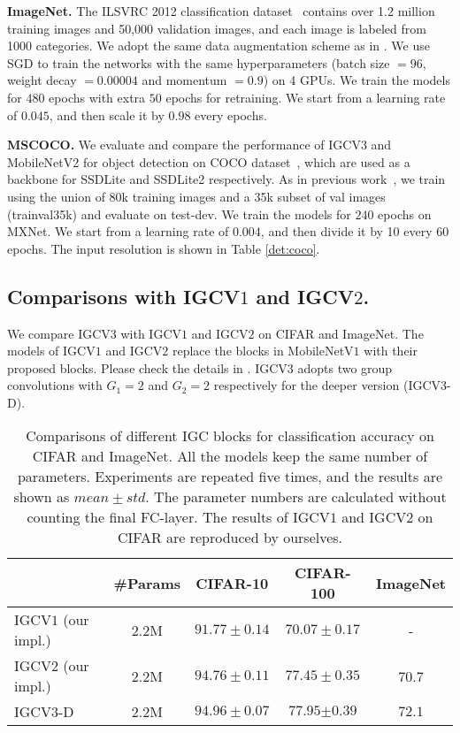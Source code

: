 \documentclass{bmvc2k}
\begin{document}
	\noindent\textbf{ImageNet.} The ILSVRC 2012 classification dataset~\cite{deng2009imagenet} contains over 1.2 million training images and 50,000 validation images, and each image is labeled from 1000 categories. We adopt the same data augmentation scheme as in \cite{HeZRS16,HeZRS16ECCV}. We use SGD to train the networks with the same hyperparameters (batch size $=96$, weight decay $=0.00004$ and momentum $=0.9$) on 4 GPUs. We train the models for $480$ epochs with extra $50$ epochs for retraining. We start from a learning rate of $0.045$, and then scale it by $0.98$ every epochs.

	\noindent\textbf{MSCOCO.} We evaluate and compare the performance of IGCV3 and MobileNetV2 for object detection on COCO dataset~\cite{lin2014microsoft}, which are used as a backbone for SSDLite and SSDLite2 respectively. As in previous work~\cite{sandler2018inverted}, we train using the union of 80k training images and a 35k subset of val images (trainval35k) and evaluate on test-dev.
	We train the models for $240$ epochs on MXNet. We start from a learning rate of $0.004$, and then divide it by 10 every 60 epochs. The input resolution is shown in Table \ref{det:coco}.
	\subsection{Comparisons with IGCV$1$ and IGCV$2$.}
	We compare IGCV$3$ with IGCV$1$ and IGCV$2$ on CIFAR and ImageNet. The models of IGCV$1$ and IGCV$2$ replace the blocks in MobileNetV$1$ with their proposed blocks. Please check the details in \cite{zhang2017interleaved,ISSC18}. IGCV$3$ adopts two group convolutions with $G_1=2$ and $G_2=2$ respectively for the deeper version (IGCV$3$-D).

	\begin{table}[htb!]
		\begin{center}
			\begin{tabular}{|l||c|c|c|c|}
				\hline
				& \#Params& CIFAR-10 & CIFAR-100& ImageNet\\
				\hline\hline
				IGCV$1$ (our impl.)    & 2.2M  &   $91.77\pm0.14$    & $70.07\pm0.17$& -\\
				IGCV$2$ (our impl.) & 2.2M  & $94.76\pm0.11$ &$77.45\pm0.35$& 70.7  \\
				IGCV$3$-D & 2.2M & $\mathbf{94.96\pm{0.07}}$ &$\mathbf{77.95{\pm0.39}}$&$\mathbf{72.1}$ \\
				\hline
			\end{tabular}
		\end{center}
		\caption{Comparisons of different IGC blocks for classification accuracy on CIFAR and ImageNet. All the models keep the same number of parameters. Experiments are repeated five times, and the results are shown as $mean\pm std$. The parameter numbers are calculated without counting the final FC-layer. The results of IGCV$1$ and IGCV$2$ on CIFAR are reproduced by ourselves.}
		\label{tab:diiff_igc}
	\end{table}
\end{document}
